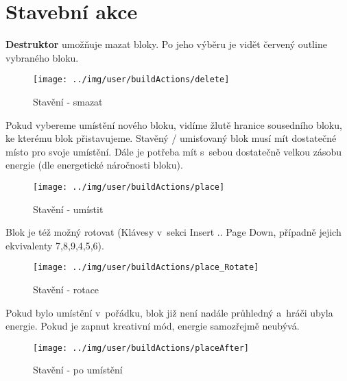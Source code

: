 
\section{Stavební akce}

\textbf{Destruktor} umožňuje mazat bloky. Po jeho výběru je vidět červený outline vybraného bloku.

\begin{figure}[!ht]\centering
\texttt{[image: ../img/user/buildActions/delete]}

\caption{Stavění - smazat}
\label{fig:user_buildActions_delete}

\end{figure}

\FloatBarrier

Pokud vybereme umístění nového bloku, vidíme žlutě hranice sousedního bloku, ke kterému blok přistavujeme. Stavěný / umisťovaný blok musí mít dostatečné místo pro svoje umístění. Dále je potřeba mít s~sebou dostatečně velkou zásobu energie (dle energetické náročnosti bloku).

\begin{figure}[!ht]\centering
\texttt{[image: ../img/user/buildActions/place]}

\caption{Stavění - umístit}
\label{fig:user_buildActions_place}

\end{figure}

\FloatBarrier

Blok je též možný rotovat (Klávesy v~sekci Insert .. Page Down, případně jejich ekvivalenty 7,8,9,4,5,6).

\begin{figure}[!ht]\centering
\texttt{[image: ../img/user/buildActions/place\_Rotate]}

\caption{Stavění - rotace}
\label{fig:user_buildActions_place_Rotate}

\end{figure}

\FloatBarrier

Pokud bylo umístění v~pořádku, blok již není nadále průhledný a~hráči ubyla energie. Pokud je zapnut kreativní mód, energie samozřejmě neubývá.

\begin{figure}[!ht]\centering
\texttt{[image: ../img/user/buildActions/placeAfter]}

\caption{Stavění - po umístění}
\label{fig:user_buildActions_placeAfter}

\end{figure}


\FloatBarrier